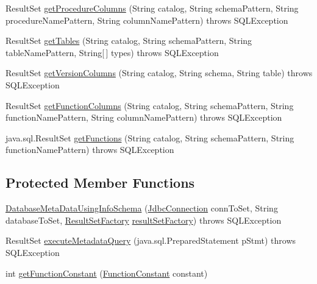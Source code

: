 \begin{DoxyCompactItemize}
\item 
Result\+Set \mbox{\hyperlink{classcom_1_1mysql_1_1cj_1_1jdbc_1_1_database_meta_data_using_info_schema_a74c529202d0ddf513d25beac132695aa}{get\+Procedure\+Columns}} (String catalog, String schema\+Pattern, String procedure\+Name\+Pattern, String column\+Name\+Pattern)  throws S\+Q\+L\+Exception 
\item 
Result\+Set \mbox{\hyperlink{classcom_1_1mysql_1_1cj_1_1jdbc_1_1_database_meta_data_using_info_schema_a8143a33c43143799bb83a33188127cf8}{get\+Tables}} (String catalog, String schema\+Pattern, String table\+Name\+Pattern, String\mbox{[}$\,$\mbox{]} types)  throws S\+Q\+L\+Exception 
\item 
Result\+Set \mbox{\hyperlink{classcom_1_1mysql_1_1cj_1_1jdbc_1_1_database_meta_data_using_info_schema_aa112f9dc4025c1dd6b4c0ec2b85f7ede}{get\+Version\+Columns}} (String catalog, String schema, String table)  throws S\+Q\+L\+Exception 
\item 
Result\+Set \mbox{\hyperlink{classcom_1_1mysql_1_1cj_1_1jdbc_1_1_database_meta_data_using_info_schema_ac2eee77f25061dbaa99451a0dbb81c02}{get\+Function\+Columns}} (String catalog, String schema\+Pattern, String function\+Name\+Pattern, String column\+Name\+Pattern)  throws S\+Q\+L\+Exception 
\item 
java.\+sql.\+Result\+Set \mbox{\hyperlink{classcom_1_1mysql_1_1cj_1_1jdbc_1_1_database_meta_data_using_info_schema_a51fdb9a66180fac6cc0c2bfbb57849e3}{get\+Functions}} (String catalog, String schema\+Pattern, String function\+Name\+Pattern)  throws S\+Q\+L\+Exception 
\end{DoxyCompactItemize}
\subsection*{Protected Member Functions}
\begin{DoxyCompactItemize}
\item 
\mbox{\hyperlink{classcom_1_1mysql_1_1cj_1_1jdbc_1_1_database_meta_data_using_info_schema_a0b688ba3bfda6e4e64a3c6374a977c52}{Database\+Meta\+Data\+Using\+Info\+Schema}} (\mbox{\hyperlink{interfacecom_1_1mysql_1_1cj_1_1jdbc_1_1_jdbc_connection}{Jdbc\+Connection}} conn\+To\+Set, String database\+To\+Set, \mbox{\hyperlink{classcom_1_1mysql_1_1cj_1_1jdbc_1_1result_1_1_result_set_factory}{Result\+Set\+Factory}} \mbox{\hyperlink{classcom_1_1mysql_1_1cj_1_1jdbc_1_1_database_meta_data_a339d870086c3e13ea14e9a6b3cf1894e}{result\+Set\+Factory}})  throws S\+Q\+L\+Exception 
\item 
Result\+Set \mbox{\hyperlink{classcom_1_1mysql_1_1cj_1_1jdbc_1_1_database_meta_data_using_info_schema_aa18be67f7fbf345b6f5da88e68db44d2}{execute\+Metadata\+Query}} (java.\+sql.\+Prepared\+Statement p\+Stmt)  throws S\+Q\+L\+Exception 
\item 
int \mbox{\hyperlink{classcom_1_1mysql_1_1cj_1_1jdbc_1_1_database_meta_data_using_info_schema_a3b2681238658a1ff285a88fef217016d}{get\+Function\+Constant}} (\mbox{\hyperlink{enumcom_1_1mysql_1_1cj_1_1jdbc_1_1_database_meta_data_using_info_schema_1_1_function_constant}{Function\+Constant}} constant)
\end{DoxyCompactItemize}
